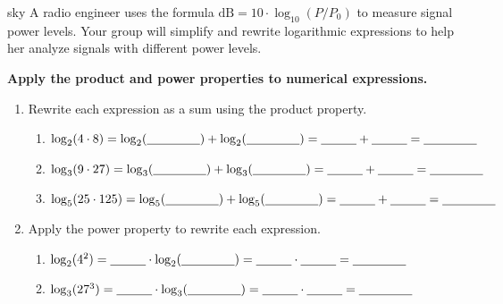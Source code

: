 \documentclass[10pt]{article}
\begin{document}
\namepartnerperiod

\vspace{0.1in}

\begin{scenariobox}{sky}
A radio engineer uses the formula $\text{dB} = 10 \cdot \log_{10}(P/P_0)$ to measure signal
power levels. Your group will simplify and rewrite logarithmic expressions to help her
analyze signals with different power levels.
\end{scenariobox}

\vspace{0.1in}

\begin{tcolorbox}[colback=white, colframe=black!40,
    title=\textbf{Tier R --- Remediate},
    fonttitle=\bfseries, arc=2mm, left=3mm, right=3mm, top=2mm, bottom=2mm]

\textbf{Apply the product and power properties to numerical expressions.}

\begin{enumerate}[leftmargin=1.8em, itemsep=10pt]

\item Rewrite each expression as a sum using the product property.

\vspace{4pt}
\begin{enumerate}[leftmargin=1.5em, itemsep=8pt, label=\alph*.]
  \item $\log_2(4 \cdot 8) = \log_2(\blank{1.5cm}) + \log_2(\blank{1.5cm}) = \blank{1cm} + \blank{1cm} = \blank{1.5cm}$
  \item $\log_3(9 \cdot 27) = \log_3(\blank{1.5cm}) + \log_3(\blank{1.5cm}) = \blank{1cm} + \blank{1cm} = \blank{1.5cm}$
  \item $\log_5(25 \cdot 125) = \log_5(\blank{1.5cm}) + \log_5(\blank{1.5cm}) = \blank{1cm} + \blank{1cm} = \blank{1.5cm}$
\end{enumerate}

\vspace{4pt}
\item Apply the power property to rewrite each expression.

\vspace{4pt}
\begin{enumerate}[leftmargin=1.5em, itemsep=8pt, label=\alph*.]
  \item $\log_2(4^2) = \blank{1cm} \cdot \log_2(\blank{1.5cm}) = \blank{1cm} \cdot \blank{1cm} = \blank{1.5cm}$
  \item $\log_3(27^3) = \blank{1cm} \cdot \log_3(\blank{1.5cm}) = \blank{1cm} \cdot \blank{1cm} = \blank{1.5cm}$
\end{enumerate}

\end{enumerate}
\end{tcolorbox}
\end{document}
